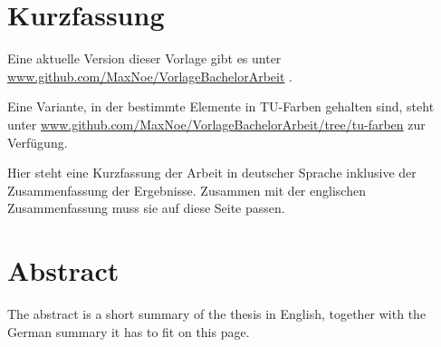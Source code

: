 \thispagestyle{plain}
\section*{Kurzfassung}

Eine aktuelle Version dieser Vorlage gibt es unter \href{https://github.com/MaxNoe/VorlageBachelorArbeit}{www.github.com/MaxNoe/VorlageBachelorArbeit} .

Eine Variante, in der bestimmte Elemente in TU-Farben gehalten sind, steht unter \href{https://github.com/MaxNoe/VorlageBachelorArbeit/tree/tu-farben}{www.github.com/MaxNoe/VorlageBachelorArbeit/tree/tu-farben}  
zur Verfügung.


Hier steht eine Kurzfassung der Arbeit in deutscher Sprache inklusive der Zusammenfassung der
Ergebnisse.
Zusammen mit der englischen Zusammenfassung muss sie auf diese Seite passen.

\section*{Abstract}

The abstract is a short summary of the thesis in English, together with the German summary it has to fit on this page.
